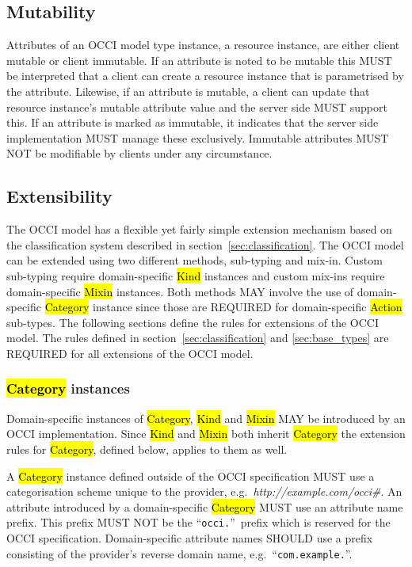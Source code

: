 \documentclass[10pt,a4paper,british]{article}
\begin{document}
\subsection{Mutability}
Attributes of an OCCI model type instance, a resource instance, are
either client mutable or client immutable. If an attribute is noted to
be mutable this MUST be interpreted that a client can create a
resource instance that is parametrised by the attribute. Likewise, if
an attribute is mutable, a client can update that resource instance's
mutable attribute value and the server side MUST support this. If an
attribute is marked as immutable, it indicates that the server side
implementation MUST manage these exclusively. Immutable attributes
MUST NOT be modifiable by clients under any circumstance.

\subsection{Extensibility}
\label{sec:extensibility}
The OCCI model has a flexible yet fairly simple extension mechanism based on
the classification system described in section~\ref{sec:classification}.
%
The OCCI model can be extended using two different methods, sub-typing and
mix-in. Custom sub-typing require domain-specific \hl{Kind} instances and
custom mix-ins require domain-specific \hl{Mixin} instances.  Both methods MAY
involve the use of domain-specific \hl{Category} instance since those are
REQUIRED for domain-specific \hl{Action} sub-types.  The following sections
define the rules for extensions of the OCCI model.
%
The rules defined in section~\ref{sec:classification} and \ref{sec:base_types}
are REQUIRED for all extensions of the OCCI model.

\subsubsection{\hl{Category} instances}
\label{sec:ext:category}
Domain-specific instances of \hl{Category}, \hl{Kind} and \hl{Mixin} MAY be
introduced by an OCCI implementation. Since \hl{Kind} and \hl{Mixin} both
inherit \hl{Category} the extension rules for \hl{Category}, defined below,
applies to them as well.

A \hl{Category} instance defined outside of the OCCI specification MUST use a
categorisation scheme unique to the provider,
e.g.~\textit{http://example.com/occi\#}.
%
An attribute introduced by a domain-specific \hl{Category} MUST
use an attribute name prefix. This prefix MUST NOT be the ``\texttt{occi.}''~prefix
which is reserved for the OCCI specification. Domain-specific attribute names
SHOULD use a prefix consisting of the provider's reverse domain name,
e.g.~``\texttt{com.example.}''.
\end{document}
